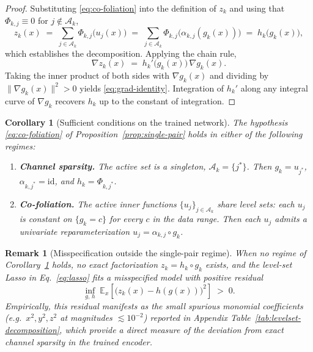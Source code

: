 \documentclass{article}
\newtheorem{corollary}{Corollary}
\newtheorem{remark}{Remark}
\begin{document}
\begin{proof}\label{app:proof-prop}
Substituting \eqref{eq:co-foliation} into the definition of $z_k$ and
using that $\Phi_{k,j} \equiv 0$ for $j \notin \mathcal{A}_k$,
$$
  z_k(x)
  \;=\; \sum_{j \in \mathcal{A}_k} \Phi_{k,j}\bigl(u_j(x)\bigr)
  \;=\; \sum_{j \in \mathcal{A}_k}
    \Phi_{k,j}\bigl(\alpha_{k,j}(g_k(x))\bigr)
  \;=\; h_k\bigl(g_k(x)\bigr),
$$
which establishes the decomposition. Applying the chain rule,
$$
  \nabla z_k(x)
  \;=\; h_k'\bigl(g_k(x)\bigr)\,\nabla g_k(x).
$$
Taking the inner product of both sides with $\nabla g_k(x)$ and dividing
by $\|\nabla g_k(x)\|^2 > 0$ yields \eqref{eq:grad-identity}. Integration
of $h_k'$ along any integral curve of $\nabla g_k$ recovers $h_k$ up to
the constant of integration.
\end{proof}

\begin{corollary}[Sufficient conditions on the trained network]
\label{cor:regimes}
The hypothesis \eqref{eq:co-foliation} of
Proposition~\ref{prop:single-pair} holds in either of the following
regimes:
\begin{enumerate}
  \item \textbf{Channel sparsity.} The active set is a singleton,
    $\mathcal{A}_k = \{j^*\}$. Then $g_k = u_{j^*}$,
    $\alpha_{k,j^*} = \mathrm{id}$, and $h_k = \Phi_{k,j^*}$.
  \item \textbf{Co-foliation.} The active inner functions
    $\{u_j\}_{j \in \mathcal{A}_k}$ share level sets: each $u_j$ is
    constant on $\{g_k = c\}$ for every $c$ in the data range. Then
    each $u_j$ admits a univariate reparameterization
    $u_j = \alpha_{k,j} \circ g_k$.
\end{enumerate}
\end{corollary}

\begin{remark}[Misspecification outside the single-pair regime]
\label{rem:misspec}
When no regime of Corollary~\ref{cor:regimes} holds, no exact
factorization $z_k = h_k \circ g_k$ exists, and the level-set Lasso in
Eq.~\eqref{eq:lasso} fits a misspecified model with positive residual
$$
  \inf_{g,\,h} \;
    \mathbb{E}_x\!\left[\bigl(z_k(x) - h(g(x))\bigr)^2\right] \;>\; 0.
$$
Empirically, this residual manifests as the small spurious monomial
coefficients (e.g.\ $x^2, y^2, z^2$ at magnitudes $\lesssim 10^{-2}$) reported in Appendix Table~\ref{tab:levelset-decomposition}, which provide a direct measure of the deviation from exact channel sparsity in the trained encoder.
\end{remark}
\end{document}
